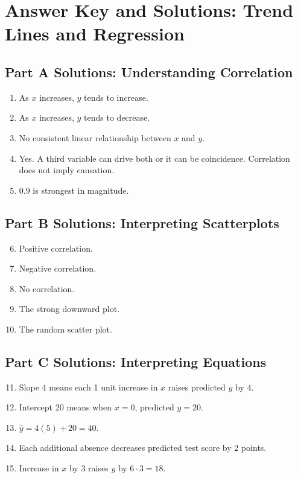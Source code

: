 \documentclass[14pt]{extarticle}
\begin{document}
\section*{Answer Key and Solutions: Trend Lines and Regression}

\subsection*{Part A Solutions: Understanding Correlation}
\begin{enumerate}
  \item As \(x\) increases, \(y\) tends to increase.
  \item As \(x\) increases, \(y\) tends to decrease.
  \item No consistent linear relationship between \(x\) and \(y\).
  \item Yes. A third variable can drive both or it can be coincidence. Correlation does not imply causation.
  \item \(0.9\) is strongest in magnitude.
\end{enumerate}

\subsection*{Part B Solutions: Interpreting Scatterplots}
\begin{enumerate}
  \setcounter{enumi}{5}
  \item Positive correlation.
  \item Negative correlation.
  \item No correlation.
  \item The strong downward plot.
  \item The random scatter plot.
\end{enumerate}

\subsection*{Part C Solutions: Interpreting Equations}
\begin{enumerate}
  \setcounter{enumi}{10}
  \item Slope 4 means each 1 unit increase in \(x\) raises predicted \(y\) by 4.
  \item Intercept 20 means when \(x=0\), predicted \(y=20\).
  \item \(\hat{y}=4(5)+20=40\).
  \item Each additional absence decreases predicted test score by 2 points.
  \item Increase in \(x\) by 3 raises \(y\) by \(6\cdot3=18\).
\end{enumerate}
\end{document}
